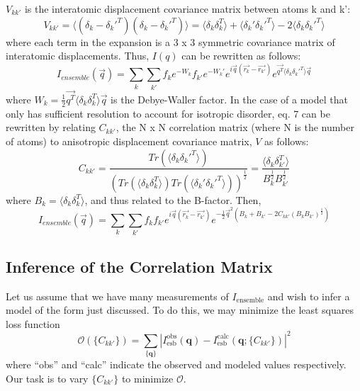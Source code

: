 \documentclass{article}
\begin{document}
$V_{kk'}$ is the interatomic displacement covariance matrix between atoms k and k':
\begin{equation}
V_{kk'} = \langle (\delta_k - \delta_k'^T)(\delta_k - \delta_k'^T) \rangle = \langle \delta_k \delta_k^T \rangle + \langle \delta_k' \delta_k'^T \rangle - 2 \langle \delta_k \delta_k'^T \rangle
\end{equation}
where each term in the expansion is a 3 x 3 symmetric covariance matrix of interatomic displacements. Thus, $I(q)$ can be rewritten as follows:
\begin{equation}
I_{ensemble} (\vec{q}) = \sum\limits_{k}\sum\limits_{k'}f_{k}e^{-W_k}f_{k'}e^{-W_k'}e^{i\vec{q}(\vec{r_{k}} - \vec{r_{k'}})}e^{\vec{q^T} \langle \delta_k \delta_k'^T \rangle \vec{q}}
\end{equation}
where $W_k = \frac{1}{2}\vec{q^T} \langle \delta_k \delta_k^T \rangle \vec{q}$ is the Debye-Waller factor.
\newline
\newline In the case of a model that only has sufficient resolution to account for isotropic disorder, eq. 7 can be rewritten by relating $C_{kk'}$, the N x N correlation matrix (where N is the number of atoms) to anisotropic displacement covariance matrix, $V$ as follows:
\begin{equation}
C_{kk'} = \frac{Tr(\langle \delta_k \delta_k'^T \rangle)}{(Tr(\langle \delta_k \delta_k^T \rangle)Tr(\langle \delta_k' \delta_k'^T \rangle))^{\frac{1}{2}}} = \frac{ \langle \delta_k \delta_{k'}^T \rangle}{B_k^{\frac{1}{2}}B_{k'}^{\frac{1}{2}}}
\end{equation}
where $B_k = \langle \delta_k \delta_k^T \rangle$, and thus related to the B-factor. Then,
\begin{equation}
I_{ensemble} (\vec{q}) = \sum\limits_{k}\sum\limits_{k'} f_{k}f_{k'}e^{i\vec{q}(\vec{r_{k}} - \vec{r_{k'}})}e^{-\frac{1}{2}\vec{q}^2(B_k + B_{k'} - 2 C_{kk'}(B_k B_{k'})^\frac{1}{2})}
\end{equation}


\subsection{Inference of the Correlation Matrix}

Let us assume that we have many measurements of $I_\mathrm{ensemble}$ and wish to infer a model of the form just discussed. To do this, we may minimize the least squares loss function
\[
\mathcal{O} ( \{ C_{kk'} \} )= \sum_{\{\mathbf{q}\}} \left| I_\mathrm{esb}^\mathrm{obs} (\mathbf{q}) 
- I_\mathrm{esb}^\mathrm{calc} (\mathbf{q}; \{ C_{kk'} \}) \right|^2
\]
where ``obs'' and ``calc'' indicate the observed and modeled values respectively. Our task is to vary $ \{ C_{kk'} \}$ to minimize $\mathcal{O}$. 
\end{document}
